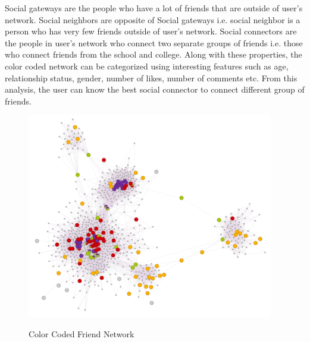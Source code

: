 \documentclass[12pt]{ucthesis}
\newcommand{\captionfonts}{\small\bf\ssp}
\begin{document}
\begin{itemize}
	Social gateways are the people who have a lot of friends that are outside of user's network. Social neighbors are opposite of Social gateways i.e. social neighbor is a person who has very few friends outside of user's network. Social connectors are the people in user's network who connect two separate groups of friends i.e. those who connect friends from the school and college. Along with these properties, the color coded network can be categorized using interesting features such as age, relationship status, gender, number of likes, number of comments etc. From this analysis, the user can know the best social connector to connect different group of friends.
\begin{figure}[!htb]
\centering
\includegraphics[height=90mm]{WolframColorCodedNetwork.PNG}
\captionfonts
\caption[Color Coded Friend Network]{Color Coded Friend Network}
\label{ColorCodedFriendNetwork}
\end{figure}


\end{itemize}
\end{document}
